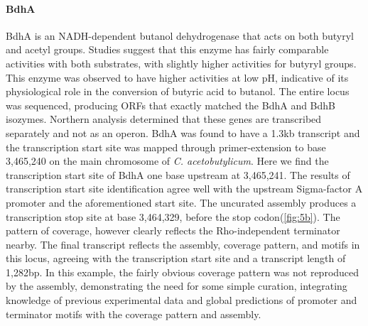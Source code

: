 \paragraph{BdhA}
BdhA is an NADH-dependent butanol dehydrogenase that acts on both butyryl and acetyl groups. Studies suggest that this enzyme has fairly comparable activities with both substrates, with slightly higher activities for butyryl groups\cite{70}. This enzyme was observed to have higher activities at low pH, indicative of its physiological role in the conversion of butyric acid to butanol. The entire locus was sequenced, producing ORFs that exactly matched the BdhA and BdhB isozymes\cite{72}. Northern analysis determined that these genes are transcribed separately and not as an operon. BdhA was found to have a 1.3kb transcript and the transcription start site was mapped through primer-extension to base 3,465,240 on the main chromosome of \textit{C. acetobutylicum}\cite{72}. Here we find the transcription start site of BdhA one base upstream at 3,465,241. The results of transcription start site identification agree well with the upstream Sigma-factor A promoter and the aforementioned start site. The uncurated assembly produces a transcription stop site at base 3,464,329, before the stop codon(\ref{fig:5b}). The pattern of coverage, however clearly reflects the Rho-independent terminator nearby. The final transcript reflects the assembly, coverage pattern, and motifs in this locus, agreeing with the transcription start site and a transcript length of 1,282bp. In this example, the fairly obvious coverage pattern was not reproduced by the assembly, demonstrating the need for some simple curation, integrating knowledge of previous experimental data and global predictions of promoter and terminator motifs with the coverage pattern and assembly.
